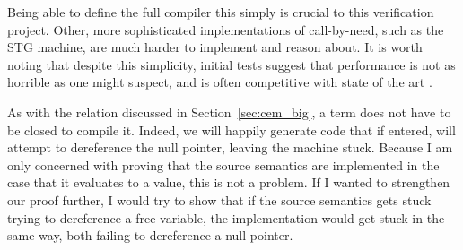 Being able to define the full compiler this simply is crucial to this
verification project. Other, more sophisticated implementations of call-by-need,
such as the STG machine, are much harder to implement and reason about. It is
worth noting that despite this simplicity, initial tests suggest that performance
is not as horrible as one might suspect, and is often competitive with state of
the art \cite{cem}.

As with the relation discussed in Section~\ref{sec:cem_big}, a term does not
have to be closed to compile it. Indeed, we will happily generate code that if
entered, will attempt to dereference the null pointer, leaving the machine
stuck. Because I am only concerned with proving that the source semantics are
implemented in the case that it evaluates to a value, this is not a problem. If
I wanted to strengthen our proof further, I would try to show that if the source
semantics gets stuck trying to dereference a free variable, the implementation
would get stuck in the same way, both failing to dereference a null pointer.    
